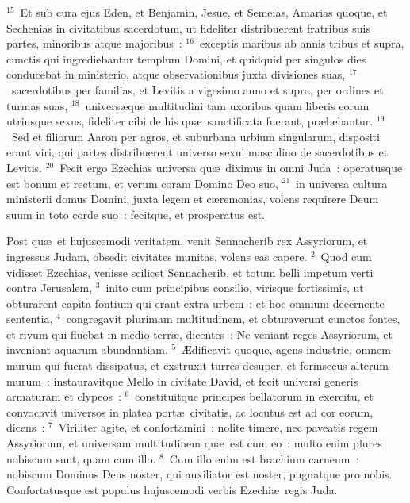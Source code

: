 ${}^{15}$~Et sub cura ejus Eden, et Benjamin, Jesue, et Semeias, Amarias quoque, et Sechenias in civitatibus sacerdotum, ut fideliter distribuerent fratribus suis partes, minoribus atque majoribus~:
${}^{16}$~exceptis maribus ab annis tribus et supra, cunctis qui ingrediebantur templum Domini, et quidquid per singulos dies conducebat in ministerio, atque observationibus juxta divisiones suas,
${}^{17}$~sacerdotibus per familias, et Levitis a vigesimo anno et supra, per ordines et turmas suas,
${}^{18}$~univers\ae que multitudini tam uxoribus quam liberis eorum utriusque sexus, fideliter cibi de his qu\ae\ sanctificata fuerant, pr\ae bebantur.
${}^{19}$~Sed et filiorum Aaron per agros, et suburbana urbium singularum, dispositi erant viri, qui partes distribuerent universo sexui masculino de sacerdotibus et Levitis.
${}^{20}$~Fecit ergo Ezechias universa qu\ae\ diximus in omni Juda~: operatusque est bonum et rectum, et verum coram Domino Deo suo,
${}^{21}$~in universa cultura ministerii domus Domini, juxta legem et c\ae remonias, volens requirere Deum suum in toto corde suo~: fecitque, et prosperatus est.

\lettrine[lines=10,image=true,loversize=0.05,lraise=-0.03]{P}{}ost qu\ae\ et hujuscemodi veritatem, venit Sennacherib rex Assyriorum, et ingressus Judam, obsedit civitates munitas, volens eas capere.
${}^{2}$~Quod cum vidisset Ezechias, venisse scilicet Sennacherib, et totum belli impetum verti contra Jerusalem,
${}^{3}$~inito cum principibus consilio, virisque fortissimis, ut obturarent capita fontium qui erant extra urbem~: et hoc omnium decernente sententia,
${}^{4}$~congregavit plurimam multitudinem, et obturaverunt cunctos fontes, et rivum qui fluebat in medio terr\ae , dicentes~: Ne veniant reges Assyriorum, et inveniant aquarum abundantiam.
${}^{5}$~\AE dificavit quoque, agens industrie, omnem murum qui fuerat dissipatus, et exstruxit turres desuper, et forinsecus alterum murum~: instauravitque Mello in civitate David, et fecit universi generis armaturam et clypeos~:
${}^{6}$~constituitque principes bellatorum in exercitu, et convocavit universos in platea port\ae\ civitatis, ac locutus est ad cor eorum, dicens~:
${}^{7}$~Viriliter agite, et confortamini~: nolite timere, nec paveatis regem Assyriorum, et universam multitudinem qu\ae\ est cum eo~: multo enim plures nobiscum sunt, quam cum illo.
${}^{8}$~Cum illo enim est brachium carneum~: nobiscum Dominus Deus noster, qui auxiliator est noster, pugnatque pro nobis. Confortatusque est populus hujuscemodi verbis Ezechi\ae\ regis Juda.


